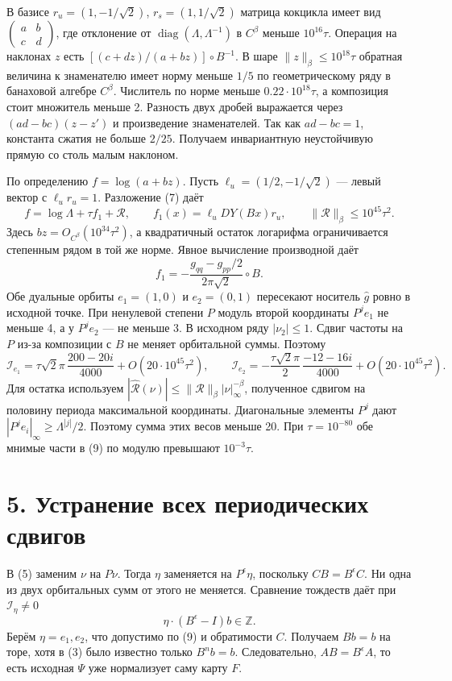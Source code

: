 \documentclass[11pt,a4paper]{article}
\newcommand{\Z}{\mathbb Z}
\newcommand{\sect}[1]{\section*{\sffamily\color{ink}#1}}
\begin{document}
В базисе $r_u=(1,-1/\sqrt2)$, $r_s=(1,1/\sqrt2)$ матрица кокцикла имеет вид $\left(\begin{smallmatrix}a&b\\c&d\end{smallmatrix}\right)$, где отклонение от $\operatorname{diag}(\Lambda,\Lambda^{-1})$ в $C^\beta$ меньше $10^{16}\tau$. Операция на наклонах $z$ есть $[(c+dz)/(a+bz)]\circ B^{-1}$. В шаре $\|z\|_\beta\le10^{18}\tau$ обратная величина к знаменателю имеет норму меньше $1/5$ по геометрическому ряду в банаховой алгебре $C^\beta$. Числитель по норме меньше $0.22\cdot10^{18}\tau$, а композиция стоит множитель меньше 2. Разность двух дробей выражается через $(ad-bc)(z-z')$ и произведение знаменателей. Так как $ad-bc=1$, константа сжатия не больше $2/25$. Получаем инвариантную неустойчивую прямую со столь малым наклоном.

По определению $f=\log(a+bz)$. Пусть $\ell_u=(1/2,-1/\sqrt2)$ --- левый вектор с $\ell_u r_u=1$. Разложение (7) даёт
\[
       f=\log\Lambda+\tau f_1+\mathcal R,\qquad
       f_1(x)=\ell_u DY(Bx)r_u,\qquad
       \|\mathcal R\|_\beta\le10^{45}\tau^2 .                       \tag{8}
\]
Здесь $bz=O_{C^\beta}(10^{34}\tau^2)$, а квадратичный остаток логарифма ограничивается степенным рядом в той же норме. Явное вычисление производной даёт
\[
 f_1=-\frac{g_{qq}-g_{pp}/2}{2\pi\sqrt2}\circ B .
\]
Обе дуальные орбиты $e_1=(1,0)$ и $e_2=(0,1)$ пересекают носитель $\widehat g$ ровно в исходной точке. При ненулевой степени $P$ модуль второй координаты $P^j e_1$ не меньше 4, а у $P^j e_2$ --- не меньше 3. В исходном ряду $|\nu_2|\le1$. Сдвиг частоты на $P$ из-за композиции с $B$ не меняет орбитальной суммы. Поэтому
\[
  \mathcal I_{e_1}=\tau\sqrt2\pi\,\frac{200-20i}{4000}
                      +O(20\cdot10^{45}\tau^2),\qquad
  \mathcal I_{e_2}=-\frac{\tau\sqrt2\pi}{2}\,
                    \frac{-12-16i}{4000}
                      +O(20\cdot10^{45}\tau^2).                   \tag{9}
\]
Для остатка используем $|\widehat{\mathcal R}(\nu)|\le\|\mathcal R\|_\beta|\nu|_\infty^{-\beta}$, полученное сдвигом на половину периода максимальной координаты. Диагональные элементы $P^j$ дают $|P^j e_i|_\infty\ge\Lambda^{|j|}/2$. Поэтому сумма этих весов меньше 20. При $\tau=10^{-80}$ обе мнимые части в (9) по модулю превышают $10^{-3}\tau$.
\newpage
\sect{5. Устранение всех периодических сдвигов}
В (5) заменим $\nu$ на $P\nu$. Тогда $\eta$ заменяется на $P^\epsilon\eta$, поскольку $CB=B^\epsilon C$. Ни одна из двух орбитальных сумм от этого не меняется. Сравнение тождеств даёт при $\mathcal I_\eta\ne0$
\[
                         \eta\cdot(B^\epsilon-I)b\in\Z .
\]
Берём $\eta=e_1,e_2$, что допустимо по (9) и обратимости $C$. Получаем $Bb=b$ на торе, хотя в (3) было известно только $B^n b=b$. Следовательно, $A B=B^\epsilon A$, то есть исходная $\Psi$ уже нормализует саму карту $F$.
\end{document}
